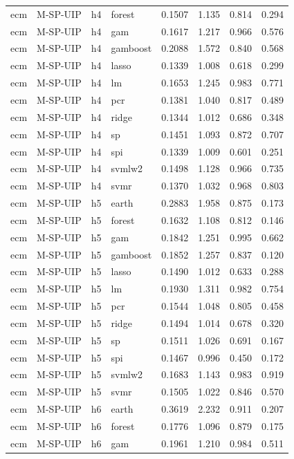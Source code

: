 \begin{ThreePartTable}
\begin{longtable}[t]{llclcccc}
ecm & M-SP-UIP & h4 & forest & 0.1507 & 1.135 & 0.814 & 0.294\\
ecm & M-SP-UIP & h4 & gam & 0.1617 & 1.217 & 0.966 & 0.576\\
ecm & M-SP-UIP & h4 & gamboost & 0.2088 & 1.572 & 0.840 & 0.568\\
ecm & M-SP-UIP & h4 & lasso & 0.1339 & 1.008 & 0.618 & 0.299\\
ecm & M-SP-UIP & h4 & lm & 0.1653 & 1.245 & 0.983 & 0.771\\
ecm & M-SP-UIP & h4 & pcr & 0.1381 & 1.040 & 0.817 & 0.489\\
ecm & M-SP-UIP & h4 & ridge & 0.1344 & 1.012 & 0.686 & 0.348\\
ecm & M-SP-UIP & h4 & sp & 0.1451 & 1.093 & 0.872 & 0.707\\
ecm & M-SP-UIP & h4 & spi & 0.1339 & 1.009 & 0.601 & 0.251\\
ecm & M-SP-UIP & h4 & svmlw2 & 0.1498 & 1.128 & 0.966 & 0.735\\
ecm & M-SP-UIP & h4 & svmr & 0.1370 & 1.032 & 0.968 & 0.803\\
\addlinespace
ecm & M-SP-UIP & h5 & earth & 0.2883 & 1.958 & 0.875 & 0.173\\
ecm & M-SP-UIP & h5 & forest & 0.1632 & 1.108 & 0.812 & 0.146\\
ecm & M-SP-UIP & h5 & gam & 0.1842 & 1.251 & 0.995 & 0.662\\
ecm & M-SP-UIP & h5 & gamboost & 0.1852 & 1.257 & 0.837 & 0.120\\
ecm & M-SP-UIP & h5 & lasso & 0.1490 & 1.012 & 0.633 & 0.288\\
ecm & M-SP-UIP & h5 & lm & 0.1930 & 1.311 & 0.982 & 0.754\\
ecm & M-SP-UIP & h5 & pcr & 0.1544 & 1.048 & 0.805 & 0.458\\
ecm & M-SP-UIP & h5 & ridge & 0.1494 & 1.014 & 0.678 & 0.320\\
ecm & M-SP-UIP & h5 & sp & 0.1511 & 1.026 & 0.691 & 0.167\\
ecm & M-SP-UIP & h5 & spi & 0.1467 & 0.996 & 0.450 & 0.172\\
ecm & M-SP-UIP & h5 & svmlw2 & 0.1683 & 1.143 & 0.983 & 0.919\\
ecm & M-SP-UIP & h5 & svmr & 0.1505 & 1.022 & 0.846 & 0.570\\
\addlinespace
ecm & M-SP-UIP & h6 & earth & 0.3619 & 2.232 & 0.911 & 0.207\\
ecm & M-SP-UIP & h6 & forest & 0.1776 & 1.096 & 0.879 & 0.175\\
ecm & M-SP-UIP & h6 & gam & 0.1961 & 1.210 & 0.984 & 0.511\\

\end{longtable}
\end{ThreePartTable}
